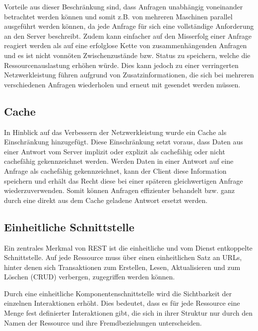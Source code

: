 Vorteile aus dieser Beschränkung sind, dass Anfragen unabhängig voneinander betrachtet werden können
und somit z.B. von mehreren Maschinen parallel ausgeführt werden können, da jede Anfrage für sich eine vollständige Anforderung an den Server beschreibt.
Zudem kann einfacher auf den Misserfolg einer Anfrage reagiert werden als auf eine erfolglose Kette von zusammenhängenden Anfragen
und es ist nicht vonnöten Zwischenzustände bzw. Status zu speichern, welche die Ressourcenauslastung erhöhen würde.
Dies kann jedoch zu einer verringerten Netzwerkleistung führen aufgrund von Zusatzinformationen,
die sich bei mehreren verschiedenen Anfragen wiederholen und erneut mit gesendet werden müssen.

\subsection{Cache}
In Hinblick auf das Verbessern der Netzwerkleistung wurde ein Cache als Einschränkung hinzugefügt.
Diese Einschränkung setzt voraus, dass Daten aus einer Antwort vom Server implizit oder explizit als cachefähig oder nicht cachefähig gekennzeichnet werden.
Werden Daten in einer Antwort auf eine Anfrage als cachefähig gekennzeichnet, kann der Client diese Information speichern und erhält das Recht diese
bei einer späteren gleichwertigen Anfrage wiederzuverwenden.
Somit können Anfragen effizienter behandelt bzw. ganz durch eine direkt aus dem Cache geladene Antwort ersetzt werden.

\subsection{Einheitliche Schnittstelle}
\label{sec:basics:restapi:interface}
Ein zentrales Merkmal von REST ist die einheitliche und vom Dienst entkoppelte Schnittstelle.
Auf jede Ressource muss über einen einheitlichen Satz an URLs, hinter denen sich Transaktionen zum Erstellen, Lesen, Aktualisieren
und zum Löschen (CRUD) verbergen, zugegriffen werden können.

Durch eine einheitliche Komponentenschnittstelle wird die Sichtbarkeit der einzelnen Interaktionen erhöht.
Dies bedeutet, dass es für jede Ressource eine Menge fest definierter Interaktionen gibt, die sich in ihrer Struktur nur durch den Namen der
Ressource und ihre Fremdbeziehungen unterscheiden.

